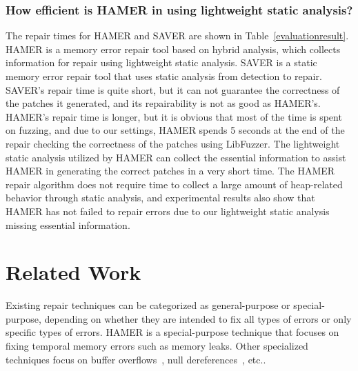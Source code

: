 \documentclass[a4paper,11pt,oneside,openany]{book}
\begin{document}
\subsection[Research Question 3]{How efficient is HAMER in using lightweight static analysis?}
The repair times for HAMER and SAVER are shown in Table~\ref{evaluationresult}. HAMER is a memory error repair tool based on hybrid analysis, which collects information for repair using lightweight static analysis. SAVER is a static memory error repair tool that uses static analysis from detection to repair. SAVER's repair time is quite short, but it can not guarantee the correctness of the patches it generated, and its repairability is not as good as HAMER's. HAMER's repair time is longer, but it is obvious that most of the time is spent on fuzzing, and due to our settings, HAMER spends 5 seconds at the end of the repair checking the correctness of the patches using LibFuzzer. The lightweight static analysis utilized by HAMER can collect the essential information to assist HAMER in generating the correct patches in a very short time. The HAMER repair algorithm does not require time to collect a large amount of heap-related behavior through static analysis, and experimental results also show that HAMER has not failed to repair errors due to our lightweight static analysis missing essential information.

\vspace{0.4cm}
\hspace{-0.7cm}

\chapter{Related Work}
Existing repair techniques can be categorized as general-purpose or special-purpose, depending on whether they are intended to fix all types of errors or only specific types of errors. HAMER is a special-purpose technique that focuses on fixing temporal memory errors such as memory leaks. Other specialized techniques focus on buffer overflows~\cite{buffer}, null dereferences~\cite{Getafix,npe}, etc.. 
\end{document}
